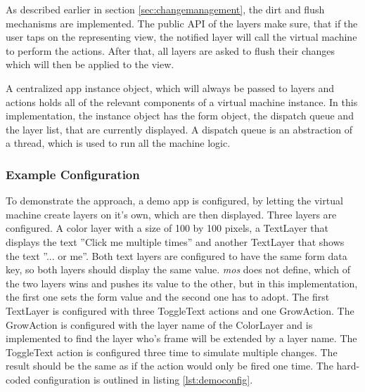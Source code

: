 As described earlier in section \ref{sec:changemanagement}, the dirt and flush mechanisms are implemented.
The public \ac{API} of the layers make sure, that if the user taps on the representing view, the notified layer will call the virtual machine to perform the actions.
After that, all layers are asked to flush their changes which will then be applied to the view.

A centralized app instance object, which will always be passed to layers and actions holds all of the relevant components of a virtual machine instance.
In this implementation, the instance object has the form object, the dispatch queue and the layer list, that are currently displayed.
A dispatch queue is an abstraction of a thread, which is used to run all the machine logic.


\subsubsection{Example Configuration}

To demonstrate the approach, a demo app is configured, by letting the virtual machine create layers on it's own, which are then displayed.
Three layers are configured.
A color layer with a size of 100 by 100 pixels, a TextLayer that displays the text ''Click me multiple times'' and another TextLayer that shows the text ''... or me''.
Both text layers are configured to have the same form data key, so both layers should display the same value.
\textit{mos} does not define, which of the two layers wins and pushes its value to the other, but in this implementation, the first one sets the form value and the second one has to adopt.
The first TextLayer is configured with three ToggleText actions and one GrowAction.
The GrowAction is configured with the layer name of the ColorLayer and is implemented to find the layer who's frame will be extended by a layer name.
The ToggleText action is configured three time to simulate multiple changes.
The result should be the same as if the action would only be fired one time.
The hard-coded configuration is outlined in listing \ref{lst:democonfig}.

